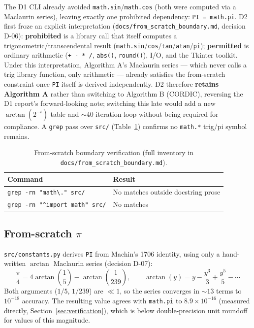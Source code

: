 \documentclass[11pt]{article}
\begin{document}
The D1 CLI already avoided \texttt{math.sin}/\texttt{math.cos} (both were computed via a Maclaurin series), leaving exactly one prohibited dependency: \texttt{PI = math.pi}. D2 first froze an explicit interpretation (\texttt{docs/from\_scratch\_boundary.md}, decision D-06): \textbf{prohibited} is a library call that itself computes a trigonometric/transcendental result (\texttt{math.sin}/\texttt{cos}/\texttt{tan}/\texttt{atan}/\texttt{pi}); \textbf{permitted} is ordinary arithmetic (\texttt{+ - * /}, \texttt{abs()}, \texttt{round()}), I/O, and the Tkinter toolkit. Under this interpretation, Algorithm A's Maclaurin series --- which never calls a trig library function, only arithmetic --- already satisfies the from-scratch constraint once \texttt{PI} itself is derived independently. D2 therefore \textbf{retains Algorithm A} rather than switching to Algorithm B (CORDIC), reversing the D1 report's forward-looking note; switching this late would add a new $\arctan(2^{-i})$ table and $\sim\!40$-iteration loop without being required for compliance. A \texttt{grep} pass over \texttt{src/} (Table~\ref{tab:grep}) confirms no \texttt{math.*} trig/pi symbol remains.

\begin{table}[htbp]
\centering
\begin{tabular}{ll}
\toprule
Command & Result \\
\midrule
\texttt{grep -rn "math\textbackslash." src/} & No matches outside docstring prose \\
\texttt{grep -rn "\textasciicircum import math" src/} & No matches \\
\bottomrule
\end{tabular}
\caption{From-scratch boundary verification (full inventory in \texttt{docs/from\_scratch\_boundary.md}).}
\label{tab:grep}
\end{table}

\subsection{From-scratch $\pi$}

\texttt{src/constants.py} derives \texttt{PI} from Machin's 1706 identity, using only a hand-written $\arctan$ Maclaurin series (decision D-07):
\[
\frac{\pi}{4} = 4\arctan\!\left(\frac{1}{5}\right) - \arctan\!\left(\frac{1}{239}\right), \qquad \arctan(y) = y - \frac{y^3}{3} + \frac{y^5}{5} - \cdots
\]
Both arguments ($1/5$, $1/239$) are $\ll 1$, so the series converges in $\sim\!13$ terms to $10^{-18}$ accuracy. The resulting value agrees with \texttt{math.pi} to $8.9\times10^{-16}$ (measured directly, Section~\ref{sec:verification}), which is below double-precision unit roundoff for values of this magnitude.
\end{document}
